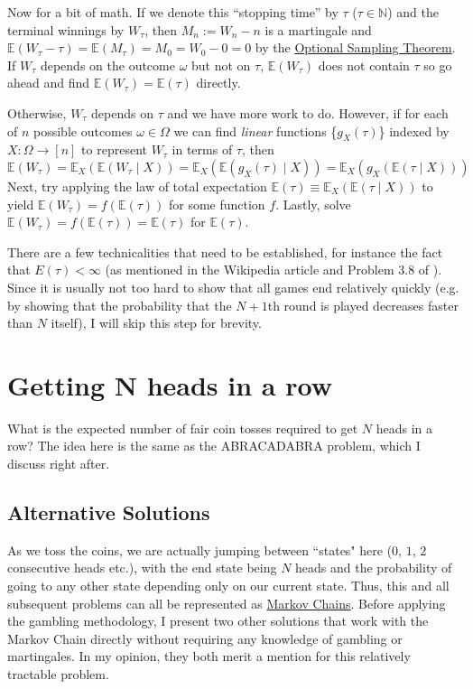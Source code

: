 \documentclass[11pt]{article}
\newcommand{\N}{\mathbb{N}}
\newcommand{\E}{\mathbb{E}}
\begin{document}
Now for a bit of math. If we denote this ``stopping time'' by $\tau$ ($\tau \in \N$) and the terminal winnings by $W_\tau$, then $M_n := W_n - n$ is a martingale and $\E(W_\tau - \tau) = \E(M_\tau) = M_0 = W_0 - 0 = 0$ by the \href{https://en.wikipedia.org/wiki/Optional_stopping_theorem}{Optional Sampling Theorem}. If $W_\tau$ depends on the outcome $\omega$ but not on $\tau$, $\E(W_\tau)$ does not contain $\tau$ so go ahead and find $\E(W_\tau) = \E(\tau)$ directly.

Otherwise, $W_\tau$ depends on $\tau$ and we have more work to do. However, if for each of $n$ possible outcomes $\omega \in \Omega$ we can find \emph{linear} functions \{$g_X(\tau)$\} indexed by $X: \Omega \rightarrow [n]$ to represent $W_\tau$ in terms of $\tau$, then $$\E(W_\tau) = \E_X(\E(W_\tau \mid X)) = \E_X(\E(g_X(\tau)\mid X)) = \E_X(g_X(\E(\tau\mid X)))$$
Next, try applying the law of total expectation $\E(\tau) \equiv \E_X(\E(\tau \mid X))$ to yield $\E(W_\tau) = f(\E(\tau))$ for some function $f$. Lastly, solve $\E(W_\tau) = f(\E(\tau)) = \E(\tau)$ for $\E(\tau)$.

There are a few technicalities that need to be established, for instance the fact that $E(\tau) < \infty$ (as mentioned in the Wikipedia article and Problem 3.8 of \cite{joshi2008quant}). Since it is usually not too hard to show that all games end relatively quickly (e.g. by showing that the probability that the $N+1$th round is played decreases faster than $N$ itself), I will skip this step for brevity.


\section{Getting N heads in a row}

What is the expected number of fair coin tosses required to get $N$ heads in a row? The idea here is the same as the ABRACADABRA problem, which I discuss right after.

\subsection{Alternative Solutions}
As we toss the coins, we are actually jumping between ``states" here ($0$, $1$, $2$ consecutive heads etc.), with the end state being $N$ heads and the probability of going to any other state depending only on our current state. Thus, this and all subsequent problems can all be represented as \href{https://en.wikipedia.org/wiki/Markov_chain}{Markov Chains}. Before applying the gambling methodology, I present two other solutions that work with the Markov Chain directly without requiring any knowledge of gambling or martingales. In my opinion, they both merit a mention for this relatively tractable problem.
\end{document}
